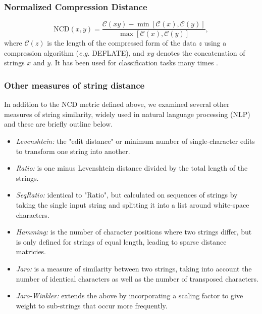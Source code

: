 \documentclass[sigconf]{acmart}
\begin{document}
    


\subsubsection{Normalized Compression Distance}
\label{ncd}
\begin{equation}
    \text{NCD}(x, y) = \frac{\mathcal{C}(xy) - \min[\mathcal{C}(x), \mathcal{C}(y)]}{\max[\mathcal{C}(x), \mathcal{C}(y)]},
\end{equation}
where $\mathcal{C}(z)$ is the length  of the compressed form of the data $z$ using a compression algorithm (\textit{e.g.} DEFLATE), and $xy$ denotes the concatenation of strings $x$ and $y$. It has been used for classification tasks many times \cite{opitz2023gzip,weinreich2023parameter,nishida2011tweet,jiang2022less}.
\subsubsection{Other measures of string distance}
\label{string_metrics}
In addition to the NCD metric defined above, we examined several other measures of string similarity, widely used in natural language processing (NLP) and these are briefly outline below.
\begin{itemize}
    \item \textit{Levenshtein:} the "edit distance" or minimum number of single-character edits to transform one string into another.
    \item \textit{Ratio:} is one minus Levenshtein distance divided by the total length of the strings.
    \item \textit{SeqRatio:} identical to "Ratio", but calculated on sequences of strings by taking the single input string and splitting it into a list around white-space characters.
    \item \textit{Hamming:} is the number of character positions where two strings differ, but is only defined for strings of equal length, leading to sparse distance matricies.
    \item \textit{Jaro:} is a measure of similarity between two strings, taking into account the number of identical characters as well as the number of transposed characters.
    \item \textit{Jaro-Winkler:} extends the above by incorporating a scaling factor to give weight to sub-strings that occur more frequently. 
\end{itemize}
\end{document}
